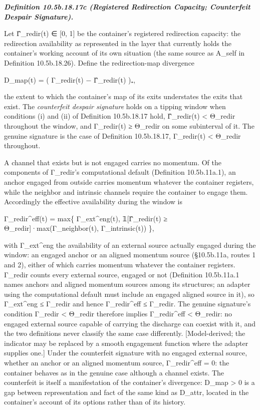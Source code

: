 \documentclass[
]{article}
\begin{document}
\emph{\textbf{Definition 10.5b.18.17c (Registered Redirection Capacity;
Counterfeit Despair Signature).}}

Let Γ̂\_redir(t) ∈ {[}0, 1{]} be the container's registered redirection
capacity: the redirection availability as represented in the layer that
currently holds the container's working account of its own situation
(the same source as A\_self in Definition 10.5b.18.26). Define the
redirection-map divergence

D\_map(t) = ( Γ\_redir(t) − Γ̂\_redir(t) )₊,

the extent to which the container's map of its exits understates the
exits that exist. The \emph{counterfeit despair signature} holds on a
tipping window when conditions (i) and (ii) of Definition 10.5b.18.17
hold, Γ̂\_redir(t) \textless{} Θ\_redir throughout the window, and
Γ\_redir(t) ≥ Θ\_redir on some subinterval of it. The genuine signature
is the case of Definition 10.5b.18.17, Γ\_redir(t) \textless{} Θ\_redir
throughout.

A channel that exists but is not engaged carries no momentum. Of the
components of Γ\_redir's computational default (Definition 10.5b.11a.1),
an anchor engaged from outside carries momentum whatever the container
registers, while the neighbor and intrinsic channels require the
container to engage them. Accordingly the effective availability during
the window is

Γ\_redir\^{}eff(t) = max\{ Γ\_ext\^{}eng(t), 𝟙{[}Γ̂\_redir(t) ≥
Θ\_redir{]}·max(Γ\_neighbor(t), Γ\_intrinsic(t)) \},

with Γ\_ext\^{}eng the availability of an external source actually
engaged during the window: an engaged anchor or an aligned momentum
source (§10.5b.11a, routes 1 and 2), either of which carries momentum
whatever the container registers. Γ\_redir counts every external source,
engaged or not (Definition 10.5b.11a.1 names anchors and aligned
momentum sources among its structures; an adapter using the
computational default must include an engaged aligned source in it), so
Γ\_ext\^{}eng ≤ Γ\_redir and hence Γ\_redir\^{}eff ≤ Γ\_redir. The
genuine signature's condition Γ\_redir \textless{} Θ\_redir therefore
implies Γ\_redir\^{}eff \textless{} Θ\_redir: no engaged external source
capable of carrying the discharge can coexist with it, and the two
definitions never classify the same case differently. {[}Model-derived;
the indicator may be replaced by a smooth engagement function where the
adapter supplies one.{]} Under the counterfeit signature with no engaged
external source, whether an anchor or an aligned momentum source,
Γ\_redir\^{}eff = 0: the container behaves as in the genuine case
although a channel exists. The counterfeit is itself a manifestation of
the container's divergence: D\_map \textgreater{} 0 is a gap between
representation and fact of the same kind as D\_attr, located in the
container's account of its options rather than of its history.
\end{document}
